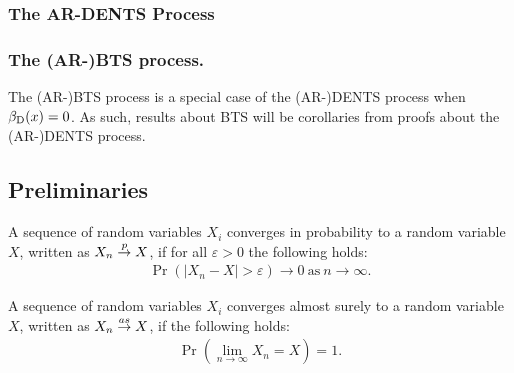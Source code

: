 \subsubsection{The AR-DENTS Process}
        









\subsubsection{The (AR-)BTS process.}

    The (AR-)BTS process is a special case of the (AR-)DENTS process when ${\beta_{{\textnormal{D}}}}(x)=0$. As such, results about BTS will be corollaries from proofs about the (AR-)DENTS process.













\subsection{Preliminaries}



    \begin{defn}
        A sequence of random variables $X_i$ \textnormal{converges in probability} to a random variable $X$, written as $X_n \overset{p}{\to} X$, if for all $\varepsilon>0$ the following holds:
        \begin{align}
            \Pr\left(\left|X_n - X\right| > \varepsilon\right) \rightarrow 0 \ \text{as} \ n \rightarrow \infty.
        \end{align}
    \end{defn}

    \begin{defn}
        A sequence of random variables $X_i$ \textnormal{converges almost surely} to a random variable $X$, written as $X_n \overset{as}{\to} X$, if the following holds:
        \begin{align}
            \Pr\left(\lim_{n\rightarrow\infty} X_n = X\right) = 1.
        \end{align}
    \end{defn}


